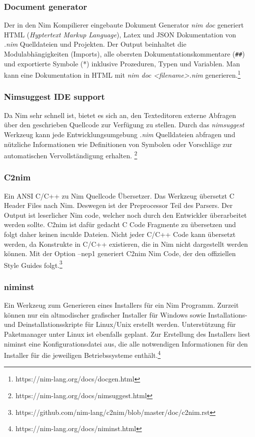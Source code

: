 \documentclass[11pt]{report}
\begin{document}
\subsubsection{Document generator}
Der in den Nim Kompilierer eingebaute Dokument Generator \emph{nim doc} generiert HTML (\emph{Hyptertext Markup Language}), Latex und JSON Dokumentation von \emph{.nim} Quelldateien und Projekten. Der Output beinhaltet die Modulabhängigkeiten (Imports), alle obersten Dokumentationskommentare (\verb|##|) und exportierte Symbole (*) inklusive Prozeduren, Typen und Variablen.
Man kann eine Dokumentation in HTML mit \emph{nim doc <filename>.nim} generieren.\footnote{https://nim-lang.org/docs/docgen.html}

\subsubsection{Nimsuggest IDE support}
Da Nim sehr schnell ist, bietet es sich an, den Texteditoren externe Abfragen über den geschrieben Quellcode zur Verfügung zu stellen.
Durch das \emph{nimsuggest} Werkzeug kann jede Entwicklungsumgebung \emph{.nim} Quelldateien abfragen und nützliche Informationen wie Definitionen von Symbolen oder Vorschläge zur automatischen Vervollständigung erhalten.
\footnote{https://nim-lang.org/docs/nimsuggest.html}

\subsubsection{C2nim}
Ein ANSI C/C++ zu Nim Quellcode Übersetzer. Das Werkzeug übersetzt C Header Files nach Nim. Deswegen ist der Preprocessor Teil des Parsers. Der Output ist leserlicher Nim code, welcher noch durch den Entwickler überarbeitet werden sollte. C2nim ist dafür gedacht C Code Fragmente zu übersetzen und folgt daher keinen inculde Dateien. Nicht jeder C/C++ Code kann übersetzt werden, da Konstrukte in C/C++ existieren, die in Nim nicht dargestellt werden können. Mit der Option --nep1 generiert C2nim Nim Code, der den offiziellen Style Guides folgt.\footnote{https://github.com/nim-lang/c2nim/blob/master/doc/c2nim.rst}

\subsubsection{niminst}
Ein Werkzeug zum Generieren eines Installers für ein Nim Programm. Zurzeit können nur ein altmodischer grafischer Installer für Windows sowie Installations- und Deinstallationsskripte für Linux/Unix erstellt werden. Unterstützung für Paketmanager unter Linux ist ebenfalls geplant.
Zur Erstellung des Installers liest niminst eine Konfigurationsdatei aus, die alle notwendigen Informationen für den Installer für die jeweiligen Betriebssysteme enthält.\footnote{https://nim-lang.org/docs/niminst.html}
\end{document}
